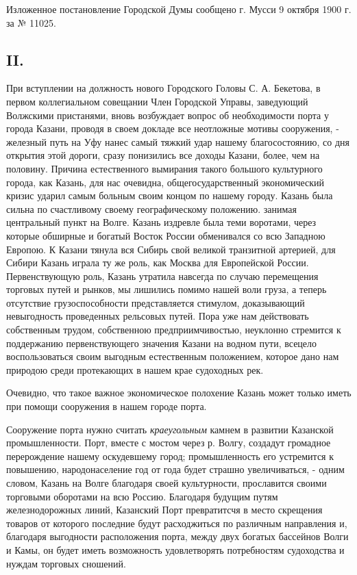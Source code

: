 \documentclass[oneside,final,14pt]{extreport}
\begin{document}
Изложенное постановление Городской Думы сообщено г. Мусси 9 октября 1900 г. за № 11025.

{%
	\centering
	\subsection*{II.}
}
При вступлении на должность нового Городского Головы С. А. Бекетова, в первом коллегиальном совещании Член Городской Управы, заведующий Волжскими пристанями, вновь возбуждает вопрос об необходимости порта у города Казани, проводя в своем докладе все неотложные мотивы сооружения, - железный путь на Уфу нанес самый тяжкий удар нашему благосостоянию, со дня открытия этой дороги, сразу понизились все доходы Казани, более, чем на половину. Причина естественного вымирания такого большого культурного города, как Казань, для нас очевидна, общегосударственный экономический кризис ударил самым больным своим концом по нашему городу. Казань была сильна по счастливому своему географическому положению. занимая центральный пункт на Волге. Казань издревле была теми воротами, через которые обширные и богатый Восток России обменивался со всю Западною Европою. К Казани тянула вся Сибирь свой великой транзитной артерией, для Сибири Казань играла ту же роль, как Москва для Европейской России. Первенствующую роль, Казань утратила навсегда по случаю перемещения торговых путей и рынков, мы лишились помимо нашей воли груза, а теперь отсутствие грузоспособности представляется стимулом, доказывающий невыгодность проведенных рельсовых путей. Пора уже нам действовать собственным трудом, собственною предприимчивостью, неуклонно стремится к поддержанию первенствующего значения Казани на водном пути, всецело воспользоваться своим выгодным естественным положением, которое дано нам природою среди протекающих в нашем крае судоходных рек.

Очевидно, что такое важное экономическое полохение Казань может только иметь при помощи сооружения в нашем городе порта.

Сооружение порта нужно считать {\it краеугольным} камнем в развитии Казанской промышленности. Порт, вместе с мостом через р. Волгу, создадут громадное перерождение нашему оскудевшему город; промышленность его устремится к повышению, народонаселение год от года будет страшно увеличиваться, - одним словом, Казань на Волге благодаря своей культурности, прославится своими торговыми оборотами на всю Россию. Благодаря будущим путям железнодорожных линий, Казанский Порт превратитсчя в место скрещения товаров от которого последние будут расходжиться по различным направления и, благодаря выгодности расположения порта, между двух богатых бассейнов Волги и Камы, он будет иметь возможность удовлетворять потребностям судоходства и нуждам торговых сношений.
\end{document}
